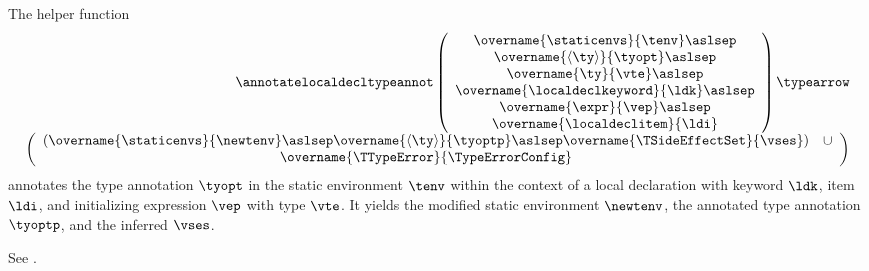 \hypertarget{def-annotatelocaldecltypeannot}{}
The helper function
\[
\begin{array}{r}
  \annotatelocaldecltypeannot
  \left(
  \begin{array}{c}
    \overname{\staticenvs}{\tenv} \aslsep \\
    \overname{\langle\ty\rangle}{\tyopt} \aslsep \\
    \overname{\ty}{\vte} \aslsep \\
    \overname{\localdeclkeyword}{\ldk} \aslsep \\
    \overname{\expr}{\vep} \aslsep\\
    \overname{\localdeclitem}{\ldi}
  \end{array}
  \right)
  \typearrow \\
  \left(
  \begin{array}{cl}
    \left(\overname{\staticenvs}{\newtenv} \aslsep \overname{\langle\ty\rangle}{\tyoptp} \aslsep \overname{\TSideEffectSet}{\vses}\right)
    & \cup \\
    \overname{\TTypeError}{\TypeErrorConfig} &
  \end{array}
  \right)
\end{array}
\]
annotates the type annotation $\tyopt$ in the static environment $\tenv$ within the context of a local declaration with keyword $\ldk$, item $\ldi$, and initializing expression $\vep$ with type $\vte$.
It yields the modified static environment $\newtenv$, the annotated type annotation $\tyoptp$, and the inferred \sideeffectsetterm{} $\vses$.
\ProseOtherwiseTypeError

See .


